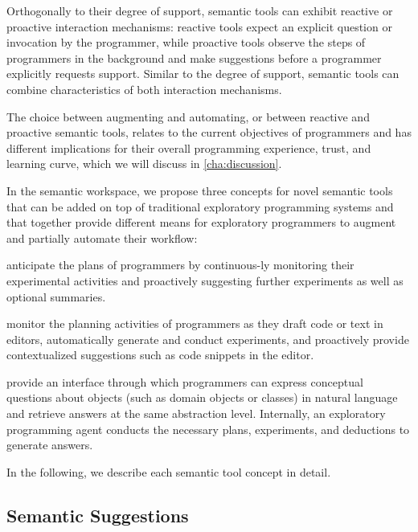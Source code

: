 Orthogonally to their degree of support, semantic tools can exhibit reactive or proactive interaction mechanisms:
reactive tools expect an explicit question or invocation by the programmer, while proactive tools observe the steps of programmers in the background and make suggestions before a programmer explicitly requests support.
Similar to the degree of support, semantic tools can combine characteristics of both interaction mechanisms.

The choice between augmenting and automating, or between reactive and proactive semantic tools, relates to the current objectives of programmers and has different implications for their overall programming experience, trust, and learning curve, which we will discuss in \cref{cha:discussion}.

In the semantic workspace, we propose three concepts for novel semantic tools that can be added on top of traditional exploratory programming systems and that together provide different means for exploratory programmers to augment and partially automate their workflow:

\begin{description}[noextralabelsep]
	\item[Semantic suggestions] anticipate the plans of programmers by continuous-\linebreak ly monitoring their experimental activities and proactively suggesting further experiments as well as optional summaries.
	\item[Semantic completions] monitor the planning activities of programmers as they draft code or text in editors, automatically generate and conduct experiments, and proactively provide contextualized suggestions such as code snippets in the editor.
	\item[Semantic conversations] provide an interface through which programmers can express conceptual questions about objects (such as domain objects or classes) in natural language and retrieve answers at the same abstraction level.
	Internally, an exploratory programming agent conducts the necessary plans, experiments, and deductions to generate answers.
\end{description}
In the following, we describe each semantic tool concept in detail.

\subsection{Semantic Suggestions}
\label{sec:approach/workspace/suggestions}

